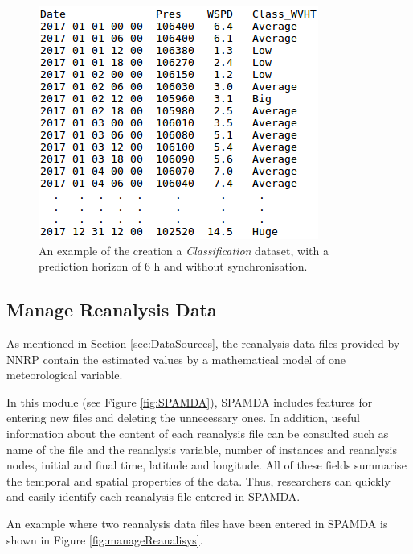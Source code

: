 \documentclass[energies,article,accept,moreauthors,pdftex]{Definitions/mdpi}
\begin{document}
\begin{paracol}{2}
\switchcolumn
	
	\vspace{-6pt}
	\begin{figure}[H]
							\includegraphics[scale=0.6]{figures/FigureClassification.png}
							\caption{An example of the creation a \textit{Classification} dataset, with a prediction horizon of $6$ h and without synchronisation.}
							\label{fig:prediction}
						\end{figure}		
				
			\subsection{Manage Reanalysis Data}
				
				As mentioned in Section \ref{sec:DataSources}, the reanalysis data files provided by NNRP contain the estimated values by a mathematical model of one meteorological variable.
				
				In this module (see Figure \ref{fig:SPAMDA}), SPAMDA includes features for entering new files and deleting the unnecessary ones. In addition, useful information about the content of each reanalysis file can be consulted such as name of the file and the reanalysis variable, number of instances and reanalysis nodes, initial and final time, latitude and longitude. All of these fields summarise the temporal and spatial properties of the data. Thus, researchers can quickly and easily identify each reanalysis file entered in SPAMDA.
				
				An example where two reanalysis data files have been entered in SPAMDA is shown in Figure \ref{fig:manageReanalisys}.
				

\end{paracol}
\end{document}
